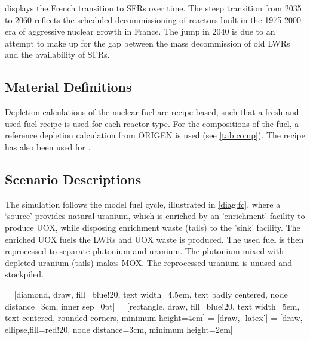  displays
the French transition to \glspl{SFR} over time.
The steep transition from 2035 to 2060 reflects the scheduled
decommissioning of reactors built in the 1975-2000
era of aggressive nuclear growth in France.
The jump in 2040 is due to an attempt to make up for the gap between the
mass decommission of old \glspl{LWR} and the availability
of \glspl{SFR}.


\subsection{Material Definitions}
Depletion calculations of the nuclear fuel are recipe-based, such that a fresh 
and used fuel recipe is used for each reactor type.
For the compositions of the fuel, a reference depletion calculation
from ORIGEN is used (see \cref{tab:comp}). The recipe has also been used for
\cite{wilson_adoption_2009}.


\subsection{Scenario Descriptions}
The simulation follows the model fuel cycle, illustrated in \cref{diag:fc},
where a `source' provides natural uranium, which is enriched by an 'enrichment'
facility to produce \gls{UOX}, while disposing enrichment waste (tails)
to the 'sink' facility. The enriched \gls{UOX} fuels
the \gls{LWR}s and \gls{UOX} waste is produced. The used fuel
is then reprocessed to separate plutonium and uranium.
The plutonium mixed with depleted uranium (tails) makes \gls{MOX}.
The reprocessed uranium is unused and stockpiled.


 = [diamond, draw, fill=blue!20, 
text width=4.5em, text badly centered, node distance=3cm, inner sep=0pt]
 = [rectangle, draw, fill=blue!20, 
text width=5em, text centered, rounded corners, minimum height=4em]
 = [draw, -latex']
 = [draw, ellipse,fill=red!20, node distance=3cm,
minimum height=2em]


